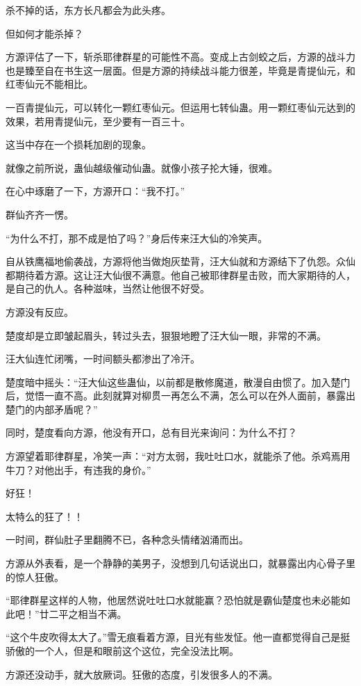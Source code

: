\begin{this_body}
杀不掉的话，东方长凡都会为此头疼。

但如何才能杀掉？

方源评估了一下，斩杀耶律群星的可能性不高。变成上古剑蛟之后，方源的战斗力也是臻至自在书生这一层面。但是方源的持续战斗能力很差，毕竟是青提仙元，和红枣仙元不能相比。

一百青提仙元，可以转化一颗红枣仙元。但运用七转仙蛊。用一颗红枣仙元达到的效果，若用青提仙元，至少要有一百三十。

这当中存在一个损耗加剧的现象。

就像之前所说，蛊仙越级催动仙蛊。就像小孩子抡大锤，很难。

在心中琢磨了一下，方源开口：“我不打。”

群仙齐齐一愣。

“为什么不打，那不成是怕了吗？”身后传来汪大仙的冷笑声。

自从铁鹰福地偷袭战，方源将他当做炮灰垫背，汪大仙就和方源结下了仇怨。众仙都期待着方源。这让汪大仙很不满意。他自己被耶律群星击败，而大家期待的人，是自己的仇人。各种滋味，当然让他很不好受。

方源没有反应。

楚度却是立即皱起眉头，转过头去，狠狠地瞪了汪大仙一眼，非常的不满。

汪大仙连忙闭嘴，一时间额头都渗出了冷汗。

楚度暗中摇头：“汪大仙这些蛊仙，以前都是散修魔道，散漫自由惯了。加入楚门后，觉悟一直不高。此刻就算对柳贯一再怎么不满，怎么可以在外人面前，暴露出楚门的内部矛盾呢？”

同时，楚度看向方源，他没有开口，总有目光来询问：为什么不打？

方源望着耶律群星，冷笑一声：“对方太弱，我吐吐口水，就能杀了他。杀鸡焉用牛刀？对他出手，有违我的身价。”

好狂！

太特么的狂了！！

一时间，群仙肚子里翻腾不已，各种念头情绪汹涌而出。

方源从外表看，是一个静静的美男子，没想到几句话说出口，就暴露出内心骨子里的惊人狂傲。

“耶律群星这样的人物，他居然说吐吐口水就能赢？恐怕就是霸仙楚度也未必能如此吧！”廿二平之相当不满。

“这个牛皮吹得太大了。”雪无痕看着方源，目光有些发怔。他一直都觉得自己是挺骄傲的一个人，但是和眼前这个这位，完全没法比啊。

方源还没动手，就大放厥词。狂傲的态度，引发很多人的不满。


\end{this_body}

